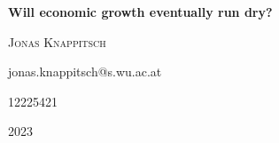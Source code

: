 \begin{titlepage}
\centering
\null
\vfill
{\huge\bfseries Will economic growth eventually run dry? \par}
\vspace{1cm}
{\Large \textsc{Jonas Knappitsch} \par}
{jonas.knappitsch@s.wu.ac.at \par}
{12225421}

\vfill 
{\large 2023 \par}
\end{titlepage}

